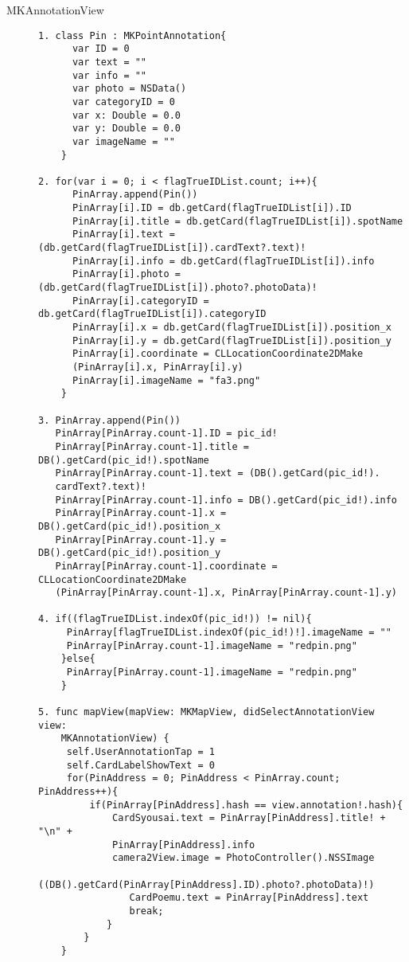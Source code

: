 \begin{description}
\item[MKAnnotationView]\mbox{} 
\begin{lstlisting}[basicstyle=\ttfamily\footnotesize, frame=single]
1. class Pin : MKPointAnnotation{
      var ID = 0
      var text = ""
      var info = ""
      var photo = NSData()
      var categoryID = 0
      var x: Double = 0.0
      var y: Double = 0.0
      var imageName = ""
    }
    
2. for(var i = 0; i < flagTrueIDList.count; i++){
      PinArray.append(Pin())
      PinArray[i].ID = db.getCard(flagTrueIDList[i]).ID
      PinArray[i].title = db.getCard(flagTrueIDList[i]).spotName
      PinArray[i].text = (db.getCard(flagTrueIDList[i]).cardText?.text)!
      PinArray[i].info = db.getCard(flagTrueIDList[i]).info
      PinArray[i].photo = (db.getCard(flagTrueIDList[i]).photo?.photoData)!
      PinArray[i].categoryID = db.getCard(flagTrueIDList[i]).categoryID
      PinArray[i].x = db.getCard(flagTrueIDList[i]).position_x
      PinArray[i].y = db.getCard(flagTrueIDList[i]).position_y
      PinArray[i].coordinate = CLLocationCoordinate2DMake
      (PinArray[i].x, PinArray[i].y)
      PinArray[i].imageName = "fa3.png"
    }
    
3. PinArray.append(Pin())
   PinArray[PinArray.count-1].ID = pic_id!
   PinArray[PinArray.count-1].title = DB().getCard(pic_id!).spotName
   PinArray[PinArray.count-1].text = (DB().getCard(pic_id!).
   cardText?.text)!
   PinArray[PinArray.count-1].info = DB().getCard(pic_id!).info
   PinArray[PinArray.count-1].x = DB().getCard(pic_id!).position_x
   PinArray[PinArray.count-1].y = DB().getCard(pic_id!).position_y
   PinArray[PinArray.count-1].coordinate = CLLocationCoordinate2DMake
   (PinArray[PinArray.count-1].x, PinArray[PinArray.count-1].y)

4. if((flagTrueIDList.indexOf(pic_id!)) != nil){
     PinArray[flagTrueIDList.indexOf(pic_id!)!].imageName = ""
     PinArray[PinArray.count-1].imageName = "redpin.png"
    }else{
     PinArray[PinArray.count-1].imageName = "redpin.png"
    }
    
5. func mapView(mapView: MKMapView, didSelectAnnotationView view: 
    MKAnnotationView) {
     self.UserAnnotationTap = 1
     self.CardLabelShowText = 0
     for(PinAddress = 0; PinAddress < PinArray.count; PinAddress++){
         if(PinArray[PinAddress].hash == view.annotation!.hash){
             CardSyousai.text = PinArray[PinAddress].title! + "\n" + 
             PinArray[PinAddress].info
             camera2View.image = PhotoController().NSSImage
             ((DB().getCard(PinArray[PinAddress].ID).photo?.photoData)!)
                CardPoemu.text = PinArray[PinAddress].text
                break;
            }
        }
    }
    

\end{lstlisting}
\end{description}
